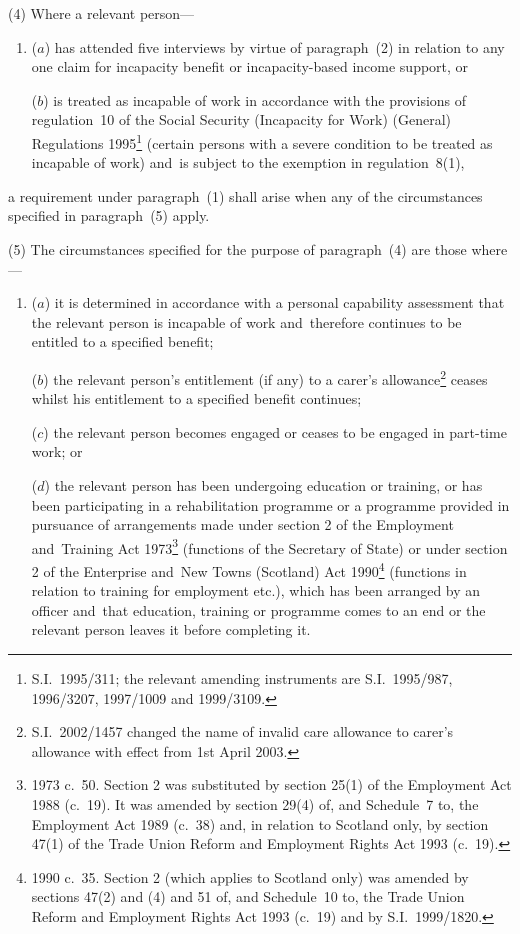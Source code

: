 \documentclass[12pt,a4paper]{article}
\begin{document}
(4) Where a relevant person—
\begin{enumerate}\item[]
($a$) has attended five interviews by virtue of paragraph~(2) in relation to any one claim for incapacity benefit or incapacity-based income support, or

($b$) is treated as incapable of work in accordance with the provisions of regulation~10 of the Social Security (Incapacity for Work) (General) Regulations 1995\footnote{S.I.~1995/311; the relevant amending instruments are S.I.~1995/987, 1996/3207, 1997/1009 and 1999/3109.} (certain persons with a severe condition to be treated as incapable of work) and~is subject to the exemption in regulation~8(1),
\end{enumerate}
a requirement under paragraph~(1) shall arise when any of the circumstances specified in paragraph~(5) apply.

(5) The circumstances specified for the purpose of paragraph~(4) are those where—
\begin{enumerate}\item[]
($a$) it is determined in accordance with a personal capability assessment that the relevant person is incapable of work and~therefore continues to be entitled to a specified benefit;

($b$) the relevant person’s entitlement (if any) to a carer’s allowance\footnote{S.I.~2002/1457 changed the name of invalid care allowance to carer’s allowance with effect from 1st April 2003.} ceases whilst his entitlement to a specified benefit continues;

($c$) the relevant person becomes engaged or ceases to be engaged in part-time work; or

($d$) the relevant person has been undergoing education or training, or has been participating in a rehabilitation programme or a programme provided in pursuance of arrangements made under section 2 of the Employment and~Training Act 1973\footnote{1973 c.~50. Section 2 was substituted by section 25(1) of the Employment Act 1988 (c.~19). It was amended by section 29(4) of, and Schedule~7 to, the Employment Act 1989 (c.~38) and, in relation to Scotland only, by section 47(1) of the Trade Union Reform and Employment Rights Act 1993 (c.~19).} (functions of the Secretary of State) or under section 2 of the Enterprise and~New Towns (Scotland) Act 1990\footnote{1990 c.~35. Section 2 (which applies to Scotland only) was amended by sections 47(2) and (4) and 51 of, and Schedule~10 to, the Trade Union Reform and Employment Rights Act 1993 (c.~19) and by S.I.~1999/1820.} (functions in relation to training for employment etc.), which has been arranged by an officer and~that education, training or programme comes to an end or the relevant person leaves it before completing it.
\end{enumerate}
\end{document}
